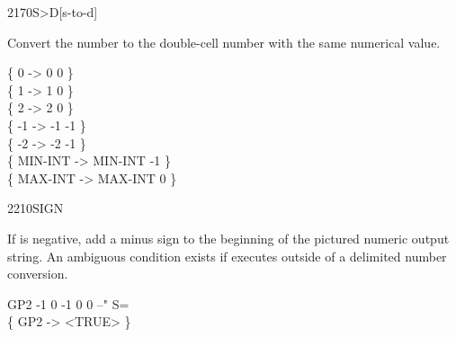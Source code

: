 \begin{worddef}[StoD]{2170}{S>D}[s-to-d]
\item {}

	Convert the number  to the double-cell number 
	with the same numerical value.

	\begin{defer}
	\testing
		\{       0  ->       0  0 \} \\
		\{       1  ->       1  0 \} \\
		\{       2  ->       2  0 \} \\
		\{      -1  ->      -1 -1 \} \\
		\{      -2  ->      -2 -1 \} \\
		\{ MIN-INT  -> MIN-INT -1 \} \\
		\{ MAX-INT  -> MAX-INT  0 \}
	\end{defer}
\end{worddef}


\begin{worddef}{2210}{SIGN}
\item {}

	If  is negative, add a minus sign to the beginning of
	the pictured numeric output string. An ambiguous condition exists
	if  executes outside of a  \word{num-end}
	delimited number conversion.

	\begin{defer}
	\testing
		\word{:} GP2   -1  0  -1  0 0   --" S= \word{;} \\
		\{ GP2 -> <TRUE> \}
	\end{defer}
\end{worddef}


